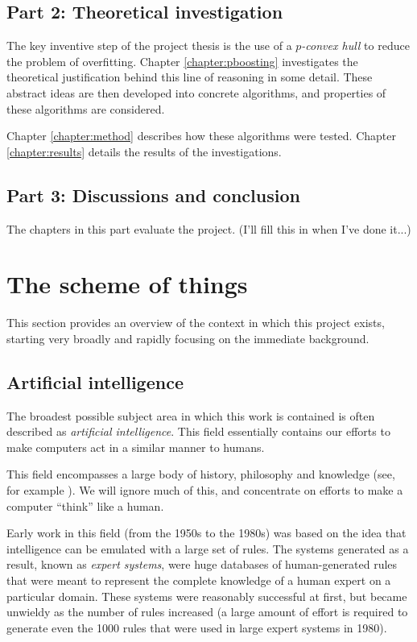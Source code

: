 \subsection*{Part 2: Theoretical investigation}

The key inventive step of the project thesis is the use of a
\emph{$p$-convex hull} to reduce the problem of overfitting.  Chapter 
\ref{chapter:pboosting} investigates the theoretical justification
behind this line of reasoning in some detail.  These abstract ideas
are then developed into concrete algorithms, and properties of these
algorithms are considered.

Chapter \ref{chapter:method} describes how these algorithms were
tested.  Chapter \ref{chapter:results} details the results of the
investigations.

\subsection*{Part 3: Discussions and conclusion}

The chapters in this part evaluate the project.  (I'll fill this in
when I've done it...)


\section{The scheme of things}

This section provides an overview of the context in which this project
exists, starting very broadly and rapidly focusing on the immediate
background.


\subsection{Artificial intelligence}

The broadest possible subject area in which this work is contained is
often described as \emph{artificial intelligence}.  This field
essentially contains our efforts to make computers act in a similar
manner to humans.

This field encompasses a large body of history, philosophy and
knowledge (see, for example \cite{Penrose89}).  We will ignore much
of this, and concentrate on efforts to make a computer ``think'' like
a human.

Early work in this field (from the 1950s to the 1980s) was based on
the idea that intelligence can be emulated with a large set of rules.
The systems generated as a result, known as \emph{expert systems},
were huge databases of human-generated rules that were meant to
represent the complete knowledge of a human expert on a particular
domain.  These systems were reasonably successful at first, but became
unwieldy as the number of rules increased (a large amount of effort is
required to generate even the 1000 rules that were used in large
expert systems in 1980). 


